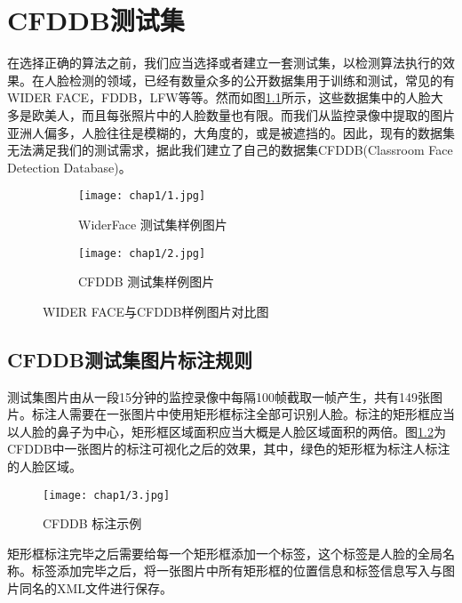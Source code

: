 \chapter{CFDDB测试集}
\label{chap:establishCFDDB}

在选择正确的算法之前，我们应当选择或者建立一套测试集，以检测算法执行的效果。在人脸检测的领域，已经有数量众多的公开数据集用于训练和测试，常见的有WIDER FACE\cite{yang2016wider}，FDDB\cite{fddbTech}，LFW\cite{huang2007labeled}等等。然而如图\ref{fig:chap1:pic}所示，这些数据集中的人脸大多是欧美人，而且每张照片中的人脸数量也有限。而我们从监控录像中提取的图片亚洲人偏多，人脸往往是模糊的，大角度的，或是被遮挡的。因此，现有的数据集无法满足我们的测试需求，据此我们建立了自己的数据集CFDDB(Classroom Face Detection Database)。


\begin{figure}[!htp]
	\centering
	\begin{subfigure}{6cm}
		\centering
		\texttt{[image: chap1/1.jpg]}
		\caption{WiderFace 测试集样例图片}
	\end{subfigure}
	\hspace{4em}
	\begin{subfigure}{6cm}
		\centering
		\texttt{[image: chap1/2.jpg]}
		\caption{CFDDB 测试集样例图片}
	\end{subfigure}
	\caption{WIDER FACE与CFDDB样例图片对比图}
	\label{fig:chap1:pic}
\end{figure}


\section{CFDDB测试集图片标注规则}

测试集图片由从一段15分钟的监控录像中每隔100帧截取一帧产生，共有149张图片。标注人需要在一张图片中使用矩形框标注全部可识别人脸。标注的矩形框应当以人脸的鼻子为中心，矩形框区域面积应当大概是人脸区域面积的两倍。图\ref{fig:chap1:cfddblbexp}为CFDDB中一张图片的标注可视化之后的效果，其中，绿色的矩形框为标注人标注的人脸区域。

\begin{figure}[!htp]
	\centering
	\texttt{[image: chap1/3.jpg]}
	\caption{CFDDB 标注示例}
	\label{fig:chap1:cfddblbexp}
\end{figure}

矩形框标注完毕之后需要给每一个矩形框添加一个标签，这个标签是人脸的全局名称。标签添加完毕之后，将一张图片中所有矩形框的位置信息和标签信息写入与图片同名的XML文件进行保存。


